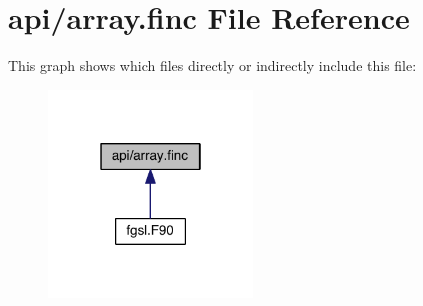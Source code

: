 \hypertarget{array_8finc}{\section{api/array.finc File Reference}
\label{array_8finc}
}
This graph shows which files directly or indirectly include this file\-:\nopagebreak
\begin{figure}[H]
\begin{center}
\leavevmode
\includegraphics[width=154pt]{array_8finc__dep__incl}
\end{center}
\end{figure}

